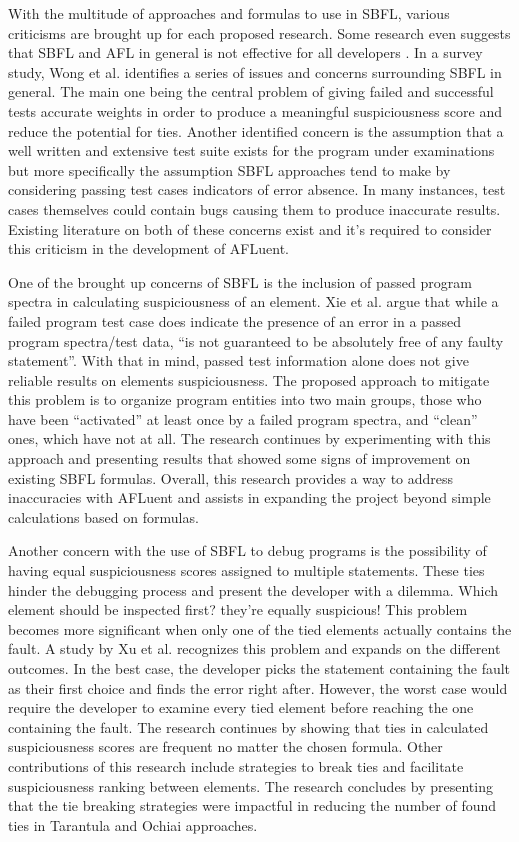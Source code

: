 With the multitude of approaches and formulas to use in SBFL, various criticisms
are brought up for each proposed research. Some research even suggests that SBFL
and AFL in general is not effective for all developers \cite{parnin}. In a survey study, Wong et al.
\cite{wong2016survey} identifies a series of issues and concerns surrounding
SBFL in general. The main one being the central problem of giving failed and
successful tests accurate weights in order to produce a meaningful
suspiciousness score and reduce the potential for ties. Another identified
concern is the assumption that a well written and extensive test suite exists
for the program under examinations but more specifically the assumption SBFL approaches tend to make by
considering passing test cases indicators of error absence. In many instances,
test cases themselves could contain bugs causing them to produce inaccurate results. Existing literature
on both of these concerns exist and it's required to consider this criticism in
the development of AFLuent.

One of the brought up concerns of SBFL is the inclusion of passed program
spectra in calculating suspiciousness of an element. Xie et al.
\cite{xie2010isolating} argue that while a failed program test case does
indicate the presence of an error in a passed program spectra/test data, ``is not
guaranteed to be absolutely free of any faulty statement''. With that in mind,
passed test information alone does not give reliable results on elements
suspiciousness. The proposed approach to mitigate this problem is to organize
program entities into two main groups, those who have been ``activated'' at
least once by a failed program spectra, and ``clean'' ones, which have not at
all. The research continues by experimenting with this approach and presenting
results that showed some signs of improvement on existing SBFL formulas.
Overall, this research provides a way to address inaccuracies with AFLuent and
assists in expanding the project beyond simple calculations based on formulas.

Another concern with the use of SBFL to debug programs is the possibility of
having equal suspiciousness scores assigned to multiple statements. These ties
hinder the debugging process and present the developer with a dilemma. Which
element should be inspected first? they're equally suspicious! This problem
becomes more significant when only one of the tied elements actually contains the
fault. A study by Xu et al. \cite{xu2011ties} recognizes this problem and
expands on the different outcomes. In the best case, the developer picks the
statement containing the fault as their first choice and finds the error right
after. However, the worst case would require the developer to examine every tied
element before reaching the one containing the fault. The research continues by
showing that ties in calculated suspiciousness scores are frequent no matter the
chosen formula. Other contributions of this research include strategies to break
ties and facilitate suspiciousness ranking between elements. The research
concludes by presenting that the tie breaking strategies were impactful in
reducing the number of found ties in Tarantula and Ochiai approaches.


